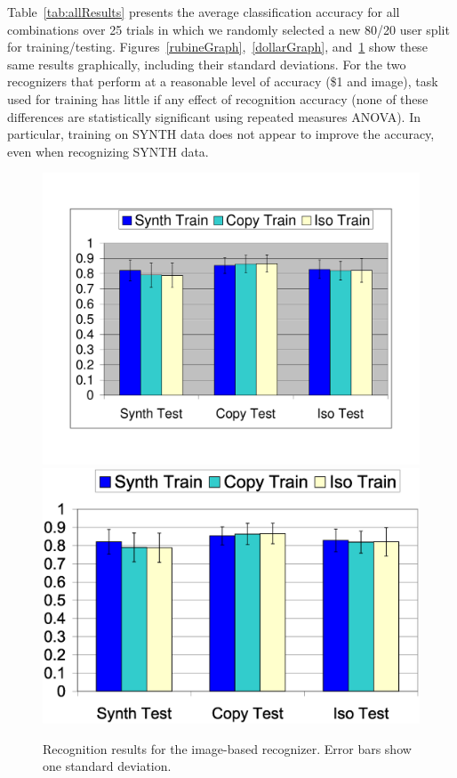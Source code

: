 \documentclass{egpubl}
\begin{document}
Table~\ref{tab:allResults} presents the average classification accuracy for all combinations over 25 trials in which we randomly selected a new 80/20 user split for training/testing.  Figures~\ref{rubineGraph},~\ref{dollarGraph}, and~\ref{visionGraph} show these same results graphically, including their standard deviations. For the two recognizers that perform at a reasonable level of accuracy (\$1 and image), task used for training has little if any effect of recognition accuracy (none of these differences are statistically significant using repeated measures ANOVA).  In particular, training on SYNTH data does not appear to improve the accuracy, even when recognizing SYNTH data.  

\begin{figure}
\ifpdf \includegraphics[width=1.0\hsize]{image_global_summary}
\else \includegraphics[width=1.0\hsize]{image_global_summary.eps} \fi
\caption{Recognition results for the image-based recognizer. Error bars show one standard deviation.}
\label{visionGraph}
\end{figure}
\end{document}
